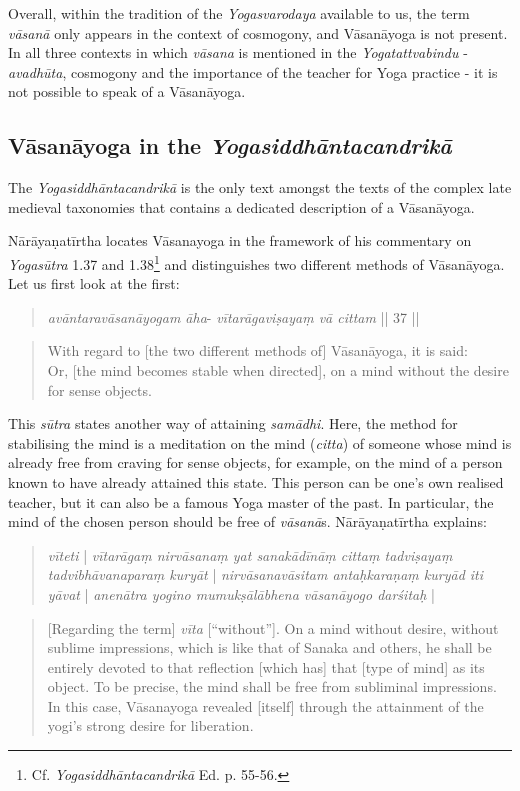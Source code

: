 Overall, within the tradition of the \textit{Yogasvarodaya} available to us, the term \textit{vāsanā} only appears in the context of cosmogony, and Vāsanāyoga is not present. In all three contexts in which \textit{vāsana} is mentioned in the \textit{Yogatattvabindu} - \textit{avadhūta}, cosmogony and the importance of the teacher for Yoga practice - it is not possible to speak of a Vāsanāyoga.

\subsection{Vāsanāyoga in the \textit{Yogasiddhāntacandrikā}}
\label{laksyayogaintrocandrika}  

The \textit{Yogasiddhāntacandrikā} is the only text amongst the texts of the complex late medieval taxonomies that contains a dedicated description of a Vāsanāyoga.

Nārāyaṇatīrtha locates Vāsanayoga in the framework of his commentary on \textit{Yogasūtra} 1.37 and 1.38\footnote{Cf. \textit{Yogasiddhāntacandrikā} Ed. p. 55-56.} and distinguishes two different methods of Vāsanāyoga. Let us first look at the first:

\begin{quote}
\textit{avāntaravāsanāyogam āha}-
\textit{vītarāgaviṣayaṃ vā cittam} || 37 ||
\end{quote}
\begin{quote}
With regard to [the two different methods of] Vāsanāyoga, it is said: \\
Or, [the mind becomes stable when directed], on a mind without the desire for sense objects. 
\end{quote}

This \textit{sūtra} states another way of attaining \textit{samādhi}. Here, the method for stabilising the mind is a meditation on the mind (\textit{citta}) of someone whose mind is already free from craving for sense objects, for example, on the mind of a person known to have already attained this state. This person can be one's own realised teacher, but it can also be a famous Yoga master of the past. In particular, the mind of the chosen person should be free of \textit{vāsanā}s. Nārāyaṇatīrtha explains:

\begin{quote}
  \textit{vīteti} | \textit{vītarāgaṃ nirvāsanaṃ yat sanakādīnāṃ cittaṃ tadviṣayaṃ tadvibhāvanaparaṃ kuryāt} | \textit{nirvāsanavāsitam antaḥkaraṇaṃ kuryād iti yāvat} | \textit{anenātra yogino mumukṣālābhena vāsanāyogo darśitaḥ} |
\end{quote}
\begin{quote}
[Regarding the term] \textit{vīta} [``without'']. On a mind without desire, without sublime impressions, which is like that of Sanaka and others, he shall be entirely devoted to that reflection [which has] that [type of mind] as its object. To be precise, the mind shall be free from subliminal impressions. In this case, Vāsanayoga revealed [itself] through the attainment of the yogi's strong desire for liberation. 
\end{quote}

